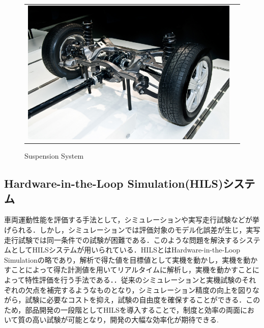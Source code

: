 \documentclass[a4paper,12pt]{article_vdlab_sotsuron}
\begin{document}
\vspace{10mm}
\begin{figure}[h!]
  \begin{tabular}{cc}
    \begin{minipage}{1.0\hsize}
      \begin{center}
	\includegraphics[scale = 1.0]{figure/pic_suspension.eps}
	\caption{Suspension System\cite{pic_sus.net}}
	\label{fig:suspension}
      \end{center}
     \end{minipage}
    \end{tabular}
\end{figure}

\newpage
\subsection{Hardware-in-the-Loop Simulation(HILS)システム}
車両運動性能を評価する手法として，シミュレーションや実写走行試験などが挙げられる．しかし，シミュレーションでは評価対象のモデル化誤差が生じ，実写走行試験では同一条件での試験が困難である．このような問題を解決するシステムとしてHILSシステムが用いられている\cite{exp_hils1}．HILSとはHardware-in-the-Loop Simulationの略であり，解析で得た値を目標値として実機を動かし，実機を動かすことによって得た計測値を用いてリアルタイムに解析し，実機を動かすことによって特性評価を行う手法である．．従来のシミュレーションと実機試験のそれぞれの欠点を補完するようなものとなり，シミュレーション精度の向上を図りながら，試験に必要なコストを抑え，試験の自由度を確保することができる．このため，部品開発の一段階としてHILSを導入することで，制度と効率の両面において質の高い試験が可能となり，開発の大幅な効率化が期待できる\cite{exp_hils2}.
\end{document}
